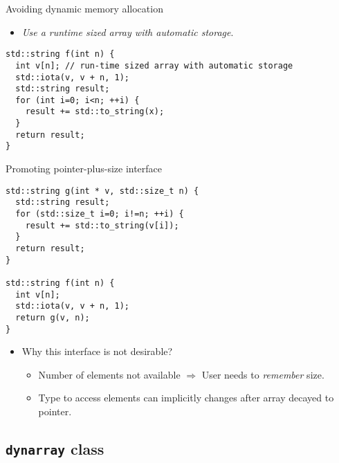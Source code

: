 \begin{frame}[t,fragile]{Avoiding dynamic memory allocation}
  \begin{itemize}
    \item \emph{Use a runtime sized array with automatic storage}.
  \end{itemize}
\begin{lstlisting}[style=cpp11]
std::string f(int n) {
  int v[n]; // run-time sized array with automatic storage
  std::iota(v, v + n, 1);
  std::string result;
  for (int i=0; i<n; ++i) {
    result += std::to_string(x);
  }
  return result;
} 
\end{lstlisting}
\end{frame}

\begin{frame}[t,fragile]{Promoting pointer-plus-size interface}
\begin{lstlisting}[style=cpp11]
std::string g(int * v, std::size_t n) {
  std::string result;
  for (std::size_t i=0; i!=n; ++i) {
    result += std::to_string(v[i]);
  }
  return result;
}

std::string f(int n) {
  int v[n];
  std::iota(v, v + n, 1);
  return g(v, n);
} 
\end{lstlisting}
\pause
\begin{itemize}
  \item Why this interface is not desirable?
    \begin{itemize}
      \item Number of elements not available $\Rightarrow$ User needs to \emph{remember} size.
      \item Type to access elements can implicitly changes after array decayed to pointer.
    \end{itemize}
\end{itemize}
\end{frame}

\subsection{\texttt{dynarray} class}

